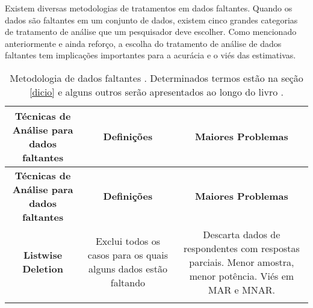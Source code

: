 \documentclass[
]{book}
\begin{document}
Existem diversas metodologias de tratamentos em dados faltantes. Quando os dados são faltantes em um conjunto de dados, existem cinco grandes categorias de tratamento de análise que um pesquisador deve escolher. Como mencionado anteriormente e ainda reforço, a escolha do tratamento de análise de dados faltantes tem implicações importantes para a acurácia e o viés das estimativas.

\begin{longtable}[]{@{}ccc@{}}
\caption{\label{tab:preprocess} Metodologia de dados faltantes \citep{tecnicasinput}. Determinados termos estão na seção \ref{dicio} e alguns outros serão apresentados ao longo do livro .}\tabularnewline
\toprule
\begin{minipage}[b]{0.30\columnwidth}\centering
\textbf{Técnicas de Análise para dados faltantes}\strut
\end{minipage} & \begin{minipage}[b]{0.30\columnwidth}\centering
\textbf{Definições}\strut
\end{minipage} & \begin{minipage}[b]{0.30\columnwidth}\centering
\textbf{Maiores Problemas}\strut
\end{minipage}\tabularnewline
\midrule
\endfirsthead
\toprule
\begin{minipage}[b]{0.30\columnwidth}\centering
\textbf{Técnicas de Análise para dados faltantes}\strut
\end{minipage} & \begin{minipage}[b]{0.30\columnwidth}\centering
\textbf{Definições}\strut
\end{minipage} & \begin{minipage}[b]{0.30\columnwidth}\centering
\textbf{Maiores Problemas}\strut
\end{minipage}\tabularnewline
\midrule
\endhead
\begin{minipage}[t]{0.30\columnwidth}\centering
\textbf{Listwise Deletion}\strut
\end{minipage} & \begin{minipage}[t]{0.30\columnwidth}\centering
Exclui todos os casos para os quais alguns dados estão faltando\strut
\end{minipage} & \begin{minipage}[t]{0.30\columnwidth}\centering
Descarta dados de respondentes com respostas parciais. Menor amostra, menor potência. Viés em MAR e MNAR.\strut
\end{minipage}\tabularnewline
\begin{minipage}[t]{0.30\columnwidth}\centering

\end{minipage}
\end{longtable}
\end{document}
